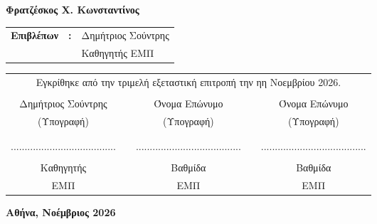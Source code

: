\begin{titlepage}
\begin{center}
		{\large{\textgreek{\textbf{Φρατζέσκος Χ. Κωνσταντίνος}}}}
		\vspace{2\baselineskip}
	\end{center}
    \vfill
	\begin{table}[h]
		\begin{tabular}{lll}
			\textgreek{\bfseries Επιβλέπων}   & \bfseries:& \textgreek{Δημήτριος Σούντρης}\\
            			                      &           & \textgreek{Καθηγητής ΕΜΠ}   \\
		\end{tabular}
	\end{table}
    \vfill
{}
\begin{table}[h]
\centering
\begin{tabular}{ccccc}
\\\multicolumn{5}{c}{Εγκρίθηκε από την τριμελή εξεταστική επιτροπή την ηη Νοεμβρίου 2026.} \\ \\
  Δημήτριος Σούντρης & &  Όνομα Επώνυμο &  & Όνομα Επώνυμο \\
(Υπογραφή) &  & (Υπογραφή) &  & (Υπογραφή) \\
 &  &  &  &  \\
  &  &  &  &  \\
...................................... &  & ...................................... &  & ...................................... \\
 &  &
 &  &  \\
Καθηγητής &  & Βαθμίδα &  & Βαθμίδα \\
ΕΜΠ &  & ΕΜΠ &  & ΕΜΠ
\end{tabular}
\end{table}
	\vfill
	\begin{center}
		{\bfseries
			\textgreek{Αθήνα, Νοέμβριος 2026}
		}
	\end{center}
	\clearpage
	\newpage
\end{titlepage}

